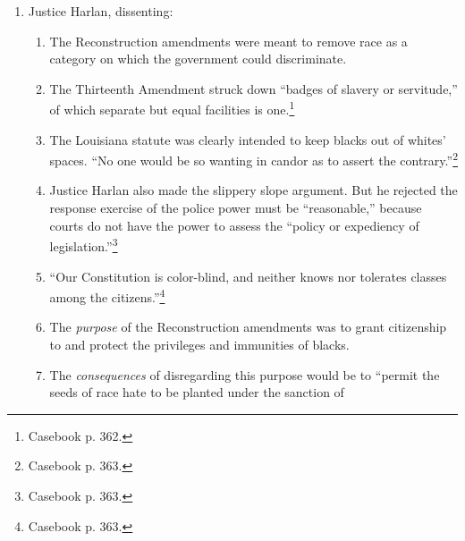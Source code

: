 \begin{enumerate}
\begin{enumerate}
        class.''\footnote{Casebook p. 361.}
        \item Was the Louisiana separate-but-equal statute unreasonable or 
        obnoxious? No.
        \item The plaintiff's ``underlying fallacy'' was that separate but equal 
        facilities ``stamps the colored race with a badge of inferiority.'' The 
        plaintiff's position assumed (wrongly) that if the racial roles were 
        reversed that whites would be oppressed. It also assumed (wrongly) that 
        social prejudices can be overcome through legislation.\footnote{Casebook 
        p. 361.} Law didn't cause group inequality and law can't fix it.
        \item The question of ``the proportion of colored blood necessary to 
        constitute a colored person'' was not at issue here.
    \end{enumerate}
    \item Justice Harlan, dissenting:
    \begin{enumerate}
        \item The Reconstruction amendments were meant to remove race as a 
        category on which the government could discriminate.
        \item The Thirteenth Amendment struck down ``badges of slavery or 
        servitude,'' of which separate but equal facilities is 
        one.\footnote{Casebook p. 362.}
        \item The Louisiana statute was clearly intended to keep blacks out of 
        whites' spaces. ``No one would be so wanting in candor as to assert the 
        contrary.''\footnote{Casebook p. 363.}
        \item Justice Harlan also made the slippery slope argument. But he 
        rejected the response exercise of the police power must be 
        ``reasonable,'' because courts do not have the power to assess the 
        ``policy or expediency of legislation.''\footnote{Casebook p. 363.}
        \item ``Our Constitution is color-blind, and neither knows nor 
        tolerates classes among the citizens.''\footnote{Casebook p. 363.} 
        \item The \emph{purpose} of the Reconstruction amendments was to grant 
        citizenship to and protect the privileges and immunities of blacks.
        \item The \emph{consequences} of disregarding this purpose would be to 
        ``permit the seeds of race hate to be planted under the sanction of 

\end{enumerate}
\end{enumerate}

